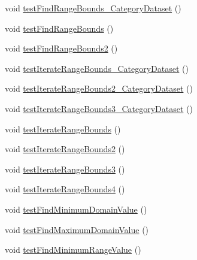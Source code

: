 \begin{DoxyCompactItemize}
\item 
void \mbox{\hyperlink{classorg_1_1jfree_1_1data_1_1general_1_1_dataset_utilities_test_a5c5a2083135188d8775658f5077bf99e}{test\+Find\+Range\+Bounds\+\_\+\+Category\+Dataset}} ()
\item 
void \mbox{\hyperlink{classorg_1_1jfree_1_1data_1_1general_1_1_dataset_utilities_test_af95fe7c43fa89f90c64e7a20cb139567}{test\+Find\+Range\+Bounds}} ()
\item 
void \mbox{\hyperlink{classorg_1_1jfree_1_1data_1_1general_1_1_dataset_utilities_test_a018a56b26ec1a35cbc230f960977fdb6}{test\+Find\+Range\+Bounds2}} ()
\item 
void \mbox{\hyperlink{classorg_1_1jfree_1_1data_1_1general_1_1_dataset_utilities_test_a84d364f9ec2235a0f810c89ca0727e25}{test\+Iterate\+Range\+Bounds\+\_\+\+Category\+Dataset}} ()
\item 
void \mbox{\hyperlink{classorg_1_1jfree_1_1data_1_1general_1_1_dataset_utilities_test_aa91348218f3fae409fe3d40ce47aa27d}{test\+Iterate\+Range\+Bounds2\+\_\+\+Category\+Dataset}} ()
\item 
void \mbox{\hyperlink{classorg_1_1jfree_1_1data_1_1general_1_1_dataset_utilities_test_a4389a254513404ebc491223e2dff839e}{test\+Iterate\+Range\+Bounds3\+\_\+\+Category\+Dataset}} ()
\item 
void \mbox{\hyperlink{classorg_1_1jfree_1_1data_1_1general_1_1_dataset_utilities_test_a0e771240c21ba37c756f0a0275779afa}{test\+Iterate\+Range\+Bounds}} ()
\item 
void \mbox{\hyperlink{classorg_1_1jfree_1_1data_1_1general_1_1_dataset_utilities_test_aaff15278a3527b15abd4d5ff6274e786}{test\+Iterate\+Range\+Bounds2}} ()
\item 
void \mbox{\hyperlink{classorg_1_1jfree_1_1data_1_1general_1_1_dataset_utilities_test_a0181c11c483f9121ec6a83b1c00b8c02}{test\+Iterate\+Range\+Bounds3}} ()
\item 
void \mbox{\hyperlink{classorg_1_1jfree_1_1data_1_1general_1_1_dataset_utilities_test_a1435401de43fe49404e3f60790a9375c}{test\+Iterate\+Range\+Bounds4}} ()
\item 
void \mbox{\hyperlink{classorg_1_1jfree_1_1data_1_1general_1_1_dataset_utilities_test_a0dc1360003f5599f7be30088e80e2fcc}{test\+Find\+Minimum\+Domain\+Value}} ()
\item 
void \mbox{\hyperlink{classorg_1_1jfree_1_1data_1_1general_1_1_dataset_utilities_test_ad664b9cba7b6a0b4bbec543df9e5b381}{test\+Find\+Maximum\+Domain\+Value}} ()
\item 
void \mbox{\hyperlink{classorg_1_1jfree_1_1data_1_1general_1_1_dataset_utilities_test_a41d9f547695232c0e4fee5afdbfcf35a}{test\+Find\+Minimum\+Range\+Value}} ()

\end{DoxyCompactItemize}
